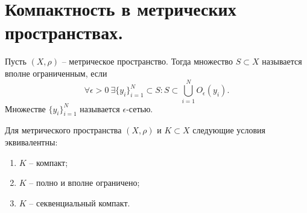 \section{Компактность в метрических пространствах.}
\begin{definition}
    Пусть $(X, \rho)$ -- метрическое пространство.
    Тогда множество $S \subset X$ называется вполне ограниченным, если
    \[
        \forall \epsilon > 0 \ \exists \{y_i\}_{i = 1}^{N} \subset S\colon S \subset \bigcup_{i = 1}^{N} O_{\epsilon}(y_i).
    \]
    Множестве $\{y_i\}_{i = 1}^{N}$ называется $\epsilon$-сетью.
\end{definition}
\begin{theorem}
    Для метрического пространства $(X, \rho)$ и $K \subset X$ следующие условия эквивалентны:
    \begin{enumerate}
        \item $K$ -- компакт;
        \item $K$ -- полно и вполне ограничено;
        \item $K$ -- секвенциальный компакт.
    \end{enumerate}
\end{theorem}
